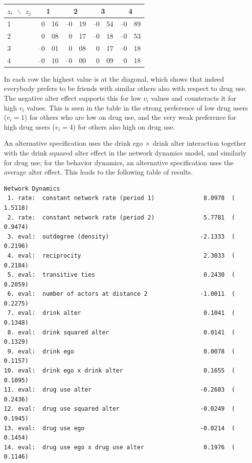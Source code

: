\documentclass[a4paper,fleqn]{article}
\newcommand{\+}{\, + \,}
\newcommand{\mcc}[2]{\multicolumn{#1}{c}{#2}}
\newcommand{\separationb}{\\[0.5ex]\hline\rule{0pt}{2ex}}
\begin{document}
{\begin{center}
\begin{tabular}{l r@{.}l  r@{.}l  r@{.}l  r@{.}l }
$ z_i \ \  \backslash  \ \ z_j $   &  \mcc{2}{ 1} & \mcc{2}{ 2} & \mcc{2}{ 3} &  \mcc{2}{ 4}
\separationb
 1        &    0&16    &  --0&19    &  --0&54    &  --0&89   \\
 2        &    0&08    &    0&17    &  --0&18    &  --0&53   \\
 3        &  --0&01    &    0&08    &    0&17    &  --0&18   \\
 4        &  --0&10    &  --0&00    &    0&09    &    0&18   \\
\hline
\end{tabular}
\end{center}
In each row the highest value is at the diagonal, which shows that
indeed everybody prefers to be friends with similar others also
with respect to drug use.
The negative alter effect supports this for low $v_i$ values
and counteracts it for high $v_i$ values.
This is seen in the table in the strong preference of low drug users
($v_i = 1$) for others who are low on drug use, and the very weak
preference for high drug users ($v_i = 4$) for others
also high on drug use.
\bigskip

An alternative specification uses the drink ego $\times$ drink alter interaction
together with the drink squared alter effect in the network dynamics model,
and similarly for drug use; for the behavior dynamics,
an alternative specification uses the average alter effect.
This leads to the following table of results.

\begin{verbatim}
Network Dynamics
 1. rate:  constant network rate (period 1)              8.0978  (   1.5118)
 2. rate:  constant network rate (period 2)              5.7781  (   0.9474)
 3. eval:  outdegree (density)                          -2.1333  (   0.2196)
 4. eval:  reciprocity                                   2.3033  (   0.2184)
 5. eval:  transitive ties                               0.2430  (   0.2059)
 6. eval:  number of actors at distance 2               -1.0011  (   0.2275)
 7. eval:  drink alter                                   0.1041  (   0.1348)
 8. eval:  drink squared alter                           0.0141  (   0.1329)
 9. eval:  drink ego                                     0.0078  (   0.1157)
10. eval:  drink ego x drink alter                       0.1655  (   0.1095)
11. eval:  drug use alter                               -0.2603  (   0.2436)
12. eval:  drug use squared alter                       -0.0249  (   0.1945)
13. eval:  drug use ego                                 -0.0214  (   0.1454)
14. eval:  drug use ego x drug use alter                 0.1976  (   0.1146)


\end{verbatim}}
\end{document}
